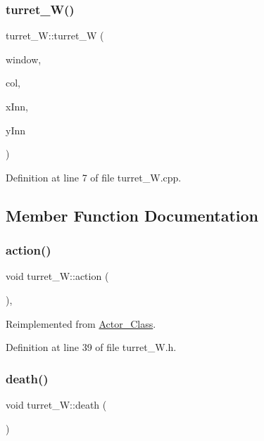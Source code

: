 \subsubsection{\texorpdfstring{turret\+\_\+\+W()}{turret\_W()}}
{\footnotesize\ttfamily turret\+\_\+\+W\+::turret\+\_\+W (\begin{DoxyParamCaption}\item[{sf\+::\+Render\+Window \&}]{window,  }\item[{\hyperlink{class_collision}{Collision}}]{col,  }\item[{int}]{x\+Inn,  }\item[{int}]{y\+Inn }\end{DoxyParamCaption})}



Definition at line 7 of file turret\+\_\+\+W.\+cpp.



\subsection{Member Function Documentation}
\hypertarget{classturret___w_a7cc0215ea12db8e371f02e377a5556f9}{}\label{classturret___w_a7cc0215ea12db8e371f02e377a5556f9} 
\subsubsection{\texorpdfstring{action()}{action()}}
{\footnotesize\ttfamily void turret\+\_\+\+W\+::action (\begin{DoxyParamCaption}{ }\end{DoxyParamCaption})\hspace{0.3cm}{\ttfamily [inline]}, {\ttfamily [virtual]}}



Reimplemented from \hyperlink{class_actor___class_ab8e23ffae108da3b8eda67c6753bdae0}{Actor\+\_\+\+Class}.



Definition at line 39 of file turret\+\_\+\+W.\+h.

\hypertarget{classturret___w_a5788baf907acfcb48fc92921f514053d}{}\label{classturret___w_a5788baf907acfcb48fc92921f514053d} 
\subsubsection{\texorpdfstring{death()}{death()}}
{\footnotesize\ttfamily void turret\+\_\+\+W\+::death (\begin{DoxyParamCaption}{ }\end{DoxyParamCaption})\hspace{0.3cm}{\ttfamily [virtual]}}



